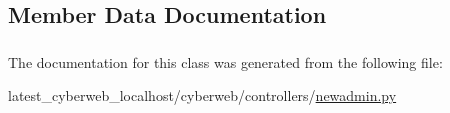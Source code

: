 \subsection{\-Member \-Data \-Documentation}
\hypertarget{classcyberweb_1_1controllers_1_1newadmin_1_1_newadmin_controller_aae8b172d5e9e5c04ef3c556dfeac6116}{
\subsubsection[{verified}]{}}\label{classcyberweb_1_1controllers_1_1newadmin_1_1_newadmin_controller_aae8b172d5e9e5c04ef3c556dfeac6116}


\-The documentation for this class was generated from the following file\-:\begin{DoxyCompactItemize}
\item 
latest\-\_\-cyberweb\-\_\-localhost/cyberweb/controllers/\hyperlink{newadmin_8py}{newadmin.\-py}\end{DoxyCompactItemize}
